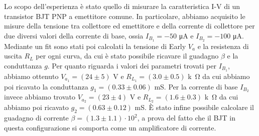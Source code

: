 Lo scopo dell’esperienza è stato quello di misurare la caratteristica I-V di un transistor BJT PNP a emettitore comune. In particolare, abbiamo acquisito le misure della tensione tra collettore ed emettitore e della corrente di collettore per due diversi valori della corrente di base, ossia $I_{B_1} = -50$ \si{\micro A} e $I_{B_2} = -100$ \si{\micro A}.\\
Mediante un fit sono stati poi calcolati la tensione di Early $V_a$ e la resistenza di uscita $R_L$ per ogni curva, da cui è stato possibile ricavare il guadagno $\beta$ e la conduttanza $g$. Per quanto riguarda i valori dei parametri trovati per $I_{B_1}$, abbiamo ottenuto $V_{a_1} = (24 \pm 5)$ \si{V} e $R_{L_1} = (3.0 \pm 0.5)$ \si{k\ohm} da cui abbiamo poi ricavato la conduttanza $g_1 = (0.33 \pm 0.06)$ \si{\milli\siemens}. Per la corrente di base $I_{B_2}$ invece abbiamo trovato $V_{a_2} = (23 \pm 4)$ \si{V} e $R_{L_2} = (1.6\pm 0.3)$ \si{k\ohm} da cui abbiamo poi ricavato $g_2 = (0.63 \pm 0.12)$ \si{\milli\siemens}. È stato infine possibile calcolare il guadagno di corrente $\beta = (1.3 \pm 1.1) \cdot 10^{2}$, a prova del fatto che il BJT in questa configurazione si comporta come un amplificatore di corrente.